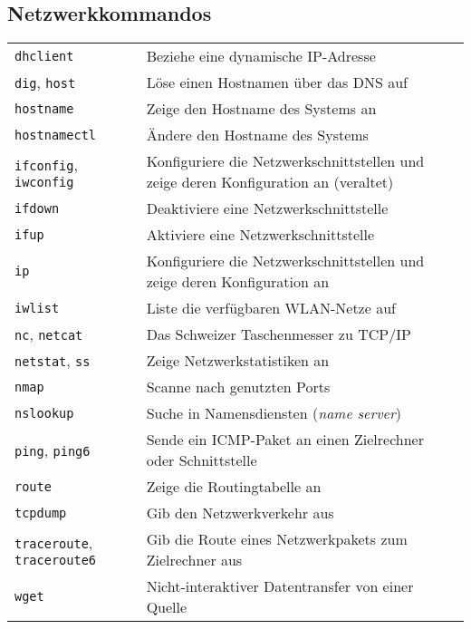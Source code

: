 \documentclass[10pt,a4paper]{article}
\begin{document}
\begin{multicols}{2}

\section{Netzwerkkommandos}
\begin{tabular}{ p{2.5cm} p{8.5cm} }
  \hline
  \texttt{dhclient} & Beziehe eine dynamische IP-Adresse \\
  \texttt{dig}, \texttt{host} & Löse einen Hostnamen über das DNS auf \\
  \texttt{hostname} & Zeige den Hostname des Systems an \\
  \texttt{hostnamectl} & Ändere den Hostname des Systems\\
  \texttt{ifconfig}, \texttt{iwconfig} & Konfiguriere die Netzwerkschnittstellen und zeige deren Konfiguration an (veraltet)\\
  \texttt{ifdown} & Deaktiviere eine Netzwerkschnittstelle \\
  \texttt{ifup} & Aktiviere eine Netzwerkschnittstelle\\
  \texttt{ip} & Konfiguriere die Netzwerkschnittstellen und zeige deren Konfiguration an \\
  \texttt{iwlist} & Liste die verfügbaren WLAN-Netze auf\\
  \texttt{nc}, \texttt{netcat} & Das Schweizer Taschenmesser zu TCP/IP \\
  \texttt{netstat}, \texttt{ss} & Zeige Netzwerkstatistiken an \\
  \texttt{nmap} & Scanne nach genutzten Ports \\
  \texttt{nslookup} & Suche in Namensdiensten (\textit{name server}) \\
  \texttt{ping}, \texttt{ping6} & Sende ein ICMP-Paket an einen Zielrechner oder Schnittstelle \\
  \texttt{route} & Zeige die Routingtabelle an \\
  \texttt{tcpdump} & Gib den Netzwerkverkehr aus \\
  \texttt{traceroute}, \texttt{traceroute6} & Gib die Route eines Netzwerkpakets zum Zielrechner aus \\
  \texttt{wget} & Nicht-interaktiver Datentransfer von einer Quelle\\
  \hline
\end{tabular}



\end{multicols}
\end{document}
